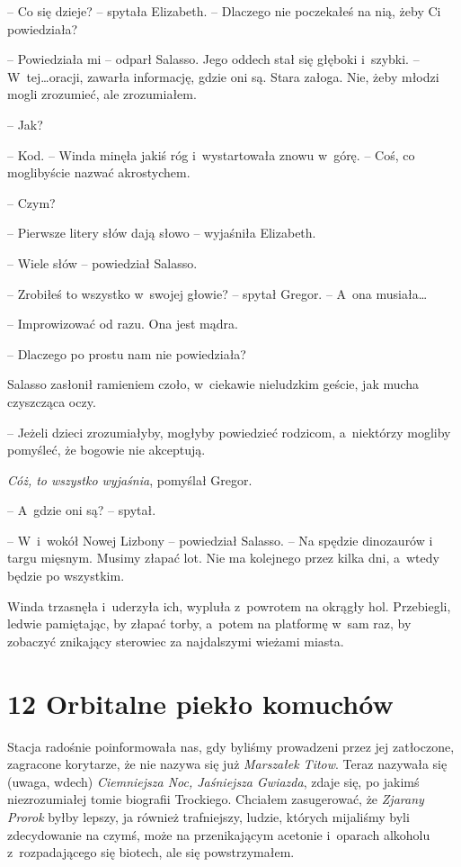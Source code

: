 \documentclass[oneside,polish,12pt,sfheadings]{mwbk}
\begin{document}
-- Co się dzieje? -- spytała Elizabeth. -- Dlaczego nie poczekałeś na nią,
żeby Ci powiedziała?

-- Powiedziała mi -- odparł Salasso. Jego oddech stał się głęboki i~szybki. -- W~tej\ldots oracji, zawarła informację, gdzie oni są. Stara
załoga. Nie, żeby młodzi mogli zrozumieć, ale zrozumiałem.

-- Jak?

-- Kod. -- Winda minęła jakiś róg i~wystartowała znowu w~górę. -- Coś, co
moglibyście nazwać akrostychem.

-- Czym?

-- Pierwsze litery słów dają słowo -- wyjaśniła Elizabeth.

-- Wiele słów -- powiedział Salasso.

-- Zrobiłeś to wszystko w~swojej głowie? -- spytał Gregor. -- A~ona
musiała\ldots

-- Improwizować od razu. Ona jest mądra.

-- Dlaczego po prostu nam nie powiedziała?

Salasso zasłonił ramieniem czoło, w~ciekawie nieludzkim geście, jak
mucha czyszcząca oczy.

-- Jeżeli dzieci zrozumiałyby, mogłyby powiedzieć rodzicom, a~niektórzy
mogliby pomyśleć, że bogowie nie akceptują.

\emph{Cóż, to wszystko wyjaśnia}, pomyślał Gregor.

-- A~gdzie oni są? -- spytał.

-- W~i~wokół Nowej Lizbony -- powiedział Salasso. -- Na spędzie dinozaurów
i targu mięsnym. Musimy złapać lot. Nie ma kolejnego przez kilka dni, a~wtedy będzie po wszystkim.

Winda trzasnęła i~uderzyła ich, wypluła z~powrotem na okrągły hol.
Przebiegli, ledwie pamiętając, by złapać torby, a~potem na platformę w~sam raz, by zobaczyć znikający sterowiec za najdalszymi wieżami miasta.



\chapter[Orbitalne piekło komuchów]{12 Orbitalne piekło komuchów}



Stacja radośnie poinformowała nas, gdy byliśmy prowadzeni przez jej
zatłoczone, zagracone korytarze, że nie nazywa się już \emph{Marszałek
Titow}. Teraz nazywała się (uwaga, wdech) \emph{Ciemniejsza Noc,
Jaśniejsza Gwiazda}, zdaje się, po jakimś niezrozumiałej tomie biografii
Trockiego. Chciałem zasugerować, że \emph{Zjarany Prorok} byłby lepszy,
ja również trafniejszy, ludzie, których mijaliśmy byli zdecydowanie na
czymś, może na przenikającym acetonie i~oparach alkoholu z~rozpadającego
się biotech, ale się powstrzymałem.
\end{document}
